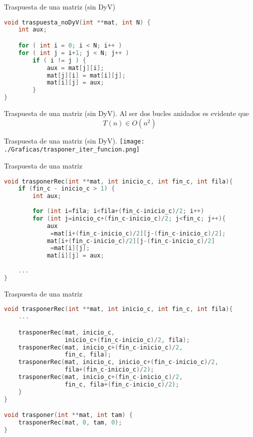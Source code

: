 \documentclass[10pt, xcolor=table]{beamer}
\begin{document}
\begin{frame}[fragile]{Traspuesta de una matriz (sin DyV)}
\begin{lstlisting}[language=C]
void traspuesta_noDyV(int **mat, int N) {
	int aux;

	for ( int i = 0; i < N; i++ )
	for ( int j = i+1; j < N; j++ )
		if ( i != j ) {
			aux = mat[j][i];
			mat[j][i] = mat[i][j];
			mat[i][j] = aux;
		}
}
\end{lstlisting}
\end{frame}

\begin{frame}[fragile]{Traspuesta de una matriz (sin DyV). }
Al ser dos bucles anidados es evidente que $$T(n) \in O(n^2)$$

\end{frame}



\begin{frame}[fragile]{Traspuesta de una matriz (sin DyV). }
\texttt{[image: ./Graficas/trasponer\_iter\_funcion.png]}
\end{frame}

\begin{frame}[fragile]{Traspuesta de una matriz}
\begin{lstlisting}[language=C]
void trasponerRec(int **mat, int inicio_c, int fin_c, int fila){
	if (fin_c - inicio_c > 1) {
		int aux;
	
		for (int i=fila; i<fila+(fin_c-inicio_c)/2; i++)
		for (int j=inicio_c+(fin_c-inicio_c)/2; j<fin_c; j++){
			aux
			 =mat[i+(fin_c-inicio_c)/2][j-(fin_c-inicio_c)/2];
			mat[i+(fin_c-inicio_c)/2][j-(fin_c-inicio_c)/2]
			 =mat[i][j];
			mat[i][j] = aux;
		
	...
}
\end{lstlisting}
\end{frame}
\begin{frame}[fragile]{Traspuesta de una matriz}
\begin{lstlisting}[language=C]
void trasponerRec(int **mat, int inicio_c, int fin_c, int fila){
	...

	trasponerRec(mat, inicio_c,
	             inicio_c+(fin_c-inicio_c)/2, fila);
	trasponerRec(mat, inicio_c+(fin_c-inicio_c)/2,
	             fin_c, fila);
	trasponerRec(mat, inicio_c, inicio_c+(fin_c-inicio_c)/2,
	             fila+(fin_c-inicio_c)/2);
	trasponerRec(mat, inicio_c+(fin_c-inicio_c)/2,
	             fin_c, fila+(fin_c-inicio_c)/2);
	}
}

void trasponer(int **mat, int tam) {
	trasponerRec(mat, 0, tam, 0);
}
\end{lstlisting}
\end{frame}
\end{document}
